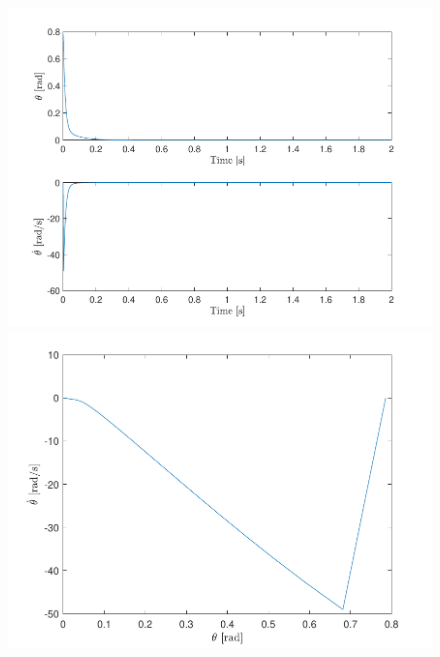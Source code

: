 \documentclass[10pt]{article}
\begin{document}
\begin{figure}[ht]
    \centering
    \begin{minipage}[b]{0.45\textwidth}
        \centering
        \includegraphics[clip,width=1\linewidth]{lab1/figs/section7_controlled_state_evolution_x_0_3.pdf}
    \end{minipage}
    \begin{minipage}[b]{0.45\textwidth}
        \centering
        \includegraphics[clip,width=1\linewidth]{lab1/figs/section7_controlled_state_orbit_x_0_3.pdf}
    \end{minipage}
\end{figure}
\end{document}
